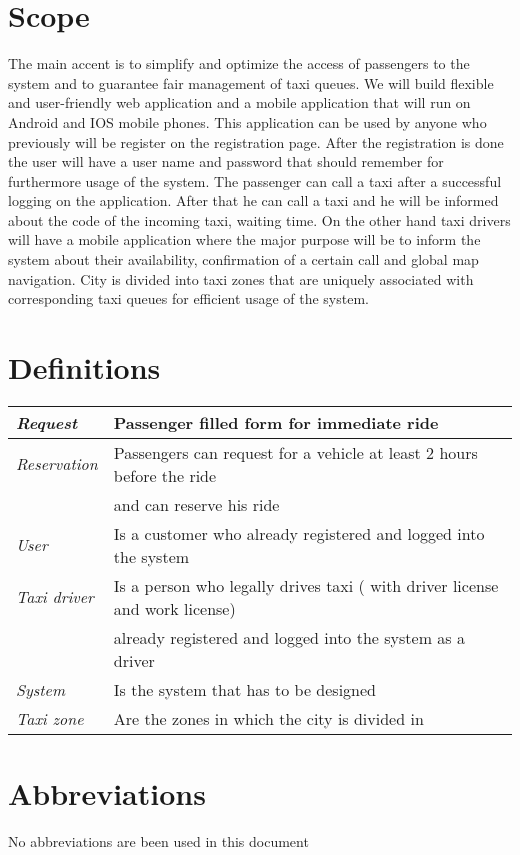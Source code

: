 \documentclass[12pt, oneside]{book}   	%
\begin{document}
\section{Scope}
The main accent is to simplify and optimize the access of passengers to the system and to guarantee fair management of taxi queues. We will build flexible and user-friendly web application and a mobile application that will run on Android and IOS mobile phones. This application can be used by anyone who previously will be register on the registration page. After the registration is done the user will have a user name and password that should remember for furthermore usage of the system. The passenger can call a taxi after a successful logging on the application. After that he can call a taxi and he will be informed about the code of the incoming taxi, waiting time. On the other hand taxi drivers will have a mobile application where the major purpose will be to inform the system about their availability, confirmation of a certain call and global map navigation.  City is divided into taxi zones that are uniquely associated with corresponding taxi queues for efficient usage of the system.
\section{Definitions}
\begin{tabular}{|l|l|}
\hline 
\textit{Request} & Passenger filled form for immediate ride \\
\hline 
\textit{Reservation} & Passengers can request for a vehicle at least 2 hours before the ride \\
 &and can reserve his ride \\
\hline 
\textit{User} & Is a customer who already registered and logged into the system\\
\hline 
\textit{Taxi driver} & Is a person who legally drives taxi ( with driver license and work license) \\
& already registered and logged into the system as a driver\\
\hline
\textit{System} & Is the system that has to be designed\\
\hline 
\textit{Taxi zone} & Are the zones in which the city is divided in\\
\hline
\end{tabular}
\section{Abbreviations}
No abbreviations are been used in this document
\end{document}
